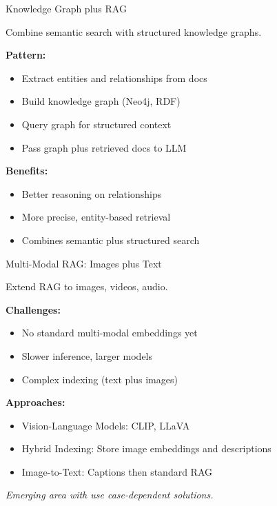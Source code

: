 \documentclass[aspectratio=169,11pt]{beamer}
\begin{document}
\begin{frame}{Knowledge Graph plus RAG}
  \begin{conceptbox}
    Combine semantic search with structured knowledge graphs.
  \end{conceptbox}

  \textbf{Pattern:}
  \begin{itemize}
    \setlength{\itemsep}{1pt}
    \item Extract entities and relationships from docs
    \item Build knowledge graph (Neo4j, RDF)
    \item Query graph for structured context
    \item Pass graph plus retrieved docs to LLM
  \end{itemize}

  \textbf{Benefits:}
  \begin{itemize}
    \setlength{\itemsep}{1pt}
    \item Better reasoning on relationships
    \item More precise, entity-based retrieval
    \item Combines semantic plus structured search
  \end{itemize}
\end{frame}

\begin{frame}{Multi-Modal RAG: Images plus Text}
  \begin{conceptbox}
    Extend RAG to images, videos, audio.
  \end{conceptbox}

  \textbf{Challenges:}
  \begin{itemize}
    \setlength{\itemsep}{1pt}
    \item No standard multi-modal embeddings yet
    \item Slower inference, larger models
    \item Complex indexing (text plus images)
  \end{itemize}

  \textbf{Approaches:}
  \begin{itemize}
    \setlength{\itemsep}{1pt}
    \item Vision-Language Models: CLIP, LLaVA
    \item Hybrid Indexing: Store image embeddings and descriptions
    \item Image-to-Text: Captions then standard RAG
  \end{itemize}

  \textit{Emerging area with use case-dependent solutions.}
\end{frame}
\end{document}
